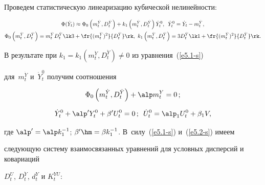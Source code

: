 Проведем статистическую линеаризацию кубической нелинейности:

   \begin{multline*}

    \Phi (\dot Y_t) \approx \Phi_0 \left( m_t^{\dot Y}, D_t^{\dot Y}\right) + k_1  \left( 

m_t^{\dot Y}, D_t^{\dot Y}\right) \dot Y_t^0,\enskip \dot Y_t^0 = \dot Y_t - m_t^{\dot Y},

\\

   \Phi_0  \left( m_t^{\dot Y}, D_t^{\dot Y}\right)= m_t^{\dot Y} D_t^{\dot Y} \lk 3 +  

\fr{( m_t^{\dot Y})^2}{ D_t^{\dot Y}}\rk,\ k_1  \left( m_t^{\dot Y}, 

D_t^{\dot Y}\right)= 3D_t^{\dot Y} \lk 1+\fr{( m_t^{\dot Y})^2}{ D_t^{\dot Y}}\rk.


\end{multline*}

В результате при $k_1=k_1 ( m_t^{\dot Y}, D_t^{\dot Y})\ne 0$ из уравнения~(\ref{e5.1-s}) 

для~$m_t^{\dot Y}$ и~$\dot Y_t^0$ получим соотношения

\begin{equation}

\Phi_0  \left( m_t^{\dot Y}, D_t^{\dot Y}\right)+\alp m_t^Y =0\,;\label{e5.4-s}

\end{equation}

\begin{equation*}

\dot Y_t^0 +\alp' Y_t^0 +\beta' U_t^0=0\,;\enskip \dot U_t^0 =\alp_1 U_t^0 

+\beta_1V, %

\end{equation*}

где $\alp' =\alp k_1^{-1}$; $\beta' \hm=\beta k_1^{-1}$. В~силу~(\ref{e5.1-s}) и~(\ref{e5.2-s}) имеем 

сле\-ду\-ющую сис\-те\-му взаимосвязанных уравнений для условных дисперсий и ковариаций 

$D_t^U$, $D_t^{\dot Y}$, $d_t^Y$ и $K_t^{YU}$:



\noindent

